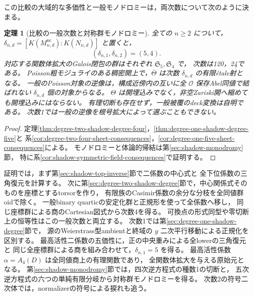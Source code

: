 \documentclass[a4paper,11pt]{ltjsarticle}
\numberwithin{equation}{section}
\theoremstyle{plain}
\newtheorem{theorem}{定理}[section]
\theoremstyle{definition}
\theoremstyle{remark}
\newcommand{\OO}{\mathcal O}
\begin{document}
この比較の大域的な多価性と一般モノドロミーは，両次数について次のように決まる。
\begin{theorem}[比較の一般次数と対称群モノドロミー]
\label{thm:main-degree-two-shadow-degree}
全ての $n\ge2$ について，$\delta_{n,d}=[K(M^{\mathrm{nc}}_{n,d}):K(N_{n,d})]$ と置くと，
\[
 (\delta_{n,1},\delta_{n,2})=(5,4).
\]
対応する関数体拡大のGalois閉包の群はそれぞれ $\mathfrak S_5,\mathfrak S_4$ で，
次数は120，24である。
Poisson粗モジュライのある稠密開上で，$\overline\Theta$ は次数 $\delta_{n,d}$ の有限\'{e}tale射となる。
一般のPoisson対象の逆像は，構成近傍内の互いに全 $\OO$ 保存Abel同値で結ばれない
$\delta_{n,d}$ 個の対象からなる。
$\Theta$ は開埋込みでなく，非空Zariski開へ縮めても開埋込みにはならない。
有理切断も存在せず，一般被覆のdeck変換は自明である。
次数1では一般の逆像を根号拡大によって選ぶこともできない。
\end{theorem}
\begin{proof}
定理\ref{thm:degree-two-shadow-degree-four}，\ref{thm:degree-one-shadow-degree-five}と
系\ref{cor:degree-two-four-sheet-consequences}，\ref{cor:degree-one-five-sheet-consequences}による。
モノドロミーと体論的帰結は第\ref{sec:shadow-monodromy}節，
特に系\ref{cor:shadow-symmetric-field-consequences}で証明する。
\end{proof}

証明では，まず第\ref{sec:shadow-top-inverse}節で二係数の中心式と
全下位係数の三角復元を計算する。
次に第\ref{sec:degree-two-shadow-degree}節で，中心関係式そのものを座標とするtorsorを作り，
有限族のCasimir係数の余分な分枝を全同値群oidで除く。
一般binary quarticの安定化群と正規形を使って全係数へ移し，
同じ座標群による商のCartesian図式から次数4を得る。
可換点の形式同型や零切断上の恒等性はこの一般次数と両立する。
次数1では第\ref{sec:degree-one-shadow-degree}節で，
源のWeierstrass型ambientと終域の $y$ 二次平行移動による正規化を区別する。
最高活性二係数の五価性に，正の中央重みによる全lowerの三角復元と
同じ全座標群による商を組み合わせて，$\delta_{n,1}=5$ を得る。
最高活性係数 $\alpha=A_4(D)$ は全同値商上の有理関数であり，
全関数体拡大を与える原始元となる。
第\ref{sec:shadow-monodromy}節では，四次逆方程式の種数1の切断と，
五次逆方程式の六つの単純有限分岐から対称群モノドロミーを得る。
次数2の符号二次体では，normalizerの符号による捩れも追う。
\end{document}
